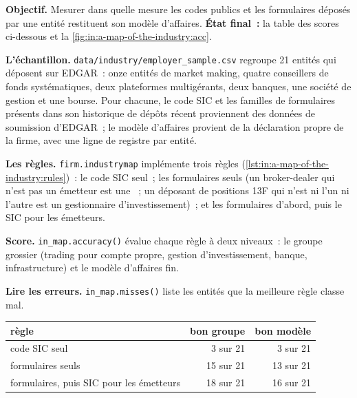 \begin{tutorial}
\textbf{Objectif.} Mesurer dans quelle mesure les codes publics et les formulaires déposés par une entité restituent son modèle d'affaires. \textbf{État
final~:} la table des scores ci-dessous et la \cref{fig:in:a-map-of-the-industry:acc}.
\begin{tutsteps}
\item \textbf{L'échantillon.} \texttt{data/industry/employer\_sample.csv} regroupe 21 entités qui déposent sur EDGAR~: onze
entités de market making, quatre conseillers de fonds systématiques, deux plateformes multigérants, deux banques, une société de gestion et une
bourse. Pour chacune, le code SIC et les familles de formulaires présents dans son historique de dépôts récent proviennent des données de soumission
d'EDGAR~; le modèle d'affaires provient de la déclaration propre de la firme, avec une ligne de registre par entité.
\item \textbf{Les règles.} \texttt{firm.industrymap} implémente trois règles
(\cref{lst:in:a-map-of-the-industry:rules})~: le code SIC seul~; les formulaires seuls (un broker-dealer qui n'est pas un émetteur est
une ~; un déposant de positions 13F qui n'est ni l'un ni l'autre est un gestionnaire d'investissement)~; et les formulaires
d'abord, puis le SIC pour les émetteurs.
\label{lst:in:a-map-of-the-industry:rules}
\item \textbf{Score.} \texttt{in\_map.accuracy()} évalue chaque règle à deux niveaux~: le groupe grossier (trading pour compte propre,
gestion d'investissement, banque, infrastructure) et le modèle d'affaires fin.
\item \textbf{Lire les erreurs.} \texttt{in\_map.misses()} liste les entités que la meilleure règle classe mal.
\end{tutsteps}
\end{tutorial}

\begin{center}\small
\begin{tabular}{@{}lrr@{}}
\toprule
règle & bon groupe & bon modèle\\
\midrule
code SIC seul & 3 sur 21 & 3 sur 21\\
formulaires seuls & 15 sur 21 & 13 sur 21\\
formulaires, puis SIC pour les émetteurs & 18 sur 21 & 16 sur 21\\
\bottomrule
\end{tabular}
\end{center}

